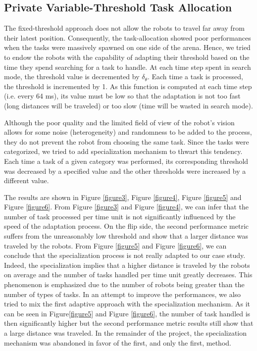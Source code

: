 \subsection{Private Variable-Threshold Task Allocation}
The fixed-threshold approach does not allow the robots to travel far away from their latest position. Consequently, the task-allocation showed poor performances when the tasks were massively spawned on one side of the arena. Hence, we tried to endow the robots with the capability of adapting their threshold based on the time they spend searching for a task to handle. At each time step spent in search mode, the threshold value is decremented by $\delta_{\theta}$. Each time a task is processed, the threshold is incremented by 1. As this function is computed at each time step (i.e. every 64 ms), its value must be low so that the adaptation is not too fast (long distances will be traveled) or too slow (time will be wasted in search mode).

Although the poor quality and the limited field of view of the robot's vision allows for some noise (heterogeneity) and randomness to be added to the process, they do not prevent the robot from choosing the same task. Since the tasks were categorized, we tried to add specialization mechanism to thwart this tendency. Each time a task of a given category was performed, its corresponding threshold was decreased by a specified value and the other thresholds were increased by a different value.

The results are shown in Figure \ref{figure3}, Figure \ref{figure4}, Figure \ref{figure5} and Figure \ref{figure6}. From Figure \ref{figure3} and Figure \ref{figure4}, we can infer that the number of task processed per time unit is not significantly influenced by the speed of the adaptation process. On the flip side, the second performance metric suffers from the unreasonably low threshold and show that a larger distance was traveled by the robots. From Figure \ref{figure5} and Figure \ref{figure6}, we can conclude that the specialization process is not really adapted to our case study. Indeed, the specialization implies that a higher distance is traveled by the robots on average and the number of tasks handled per time unit greatly decreases. This phenomenon is emphasized due to the number of robots being greater than the number of types of tasks. In an attempt to improve the performances, we also tried to mix the first adaptive approach with the specialization mechanism. As it can be seen in Figure\ref{figure5} and Figure \ref{figure6}, the number of task handled is then significantly higher but the second performance metric results still show that a large distance was traveled. In the remainder of the project, the specialization mechanism was abandoned in favor of the first, and only the first, method.

